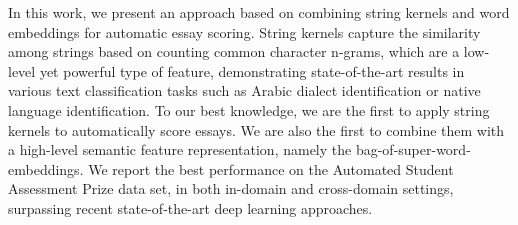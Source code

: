 In this work, we present an approach based on combining string kernels and word embeddings for automatic essay scoring. String kernels capture the similarity among strings based on counting common character n-grams, which are a low-level yet powerful type of feature, demonstrating state-of-the-art results in various text classification tasks such as Arabic dialect identification or native language identification. To our best knowledge, we are the first to apply string kernels to automatically score essays. We are also the first to combine them with a high-level semantic feature representation, namely the bag-of-super-word-embeddings. We report the best performance on the Automated Student Assessment Prize data set, in both in-domain and cross-domain settings, surpassing recent state-of-the-art deep learning approaches.
